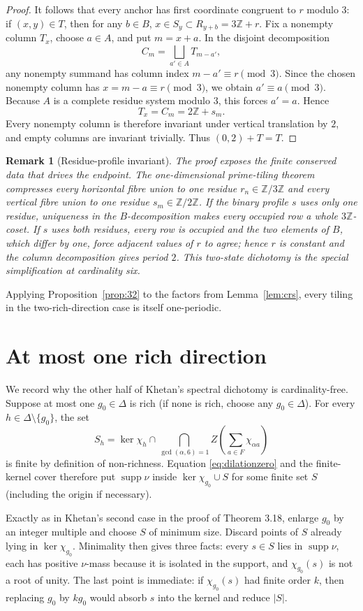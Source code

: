 \documentclass[11pt]{article}
\newtheorem{remark}[theorem]{Remark}
\newcommand{\Z}{\mathbb Z}
\begin{document}
\begin{proof}
It follows that every anchor has first coordinate congruent to $r$ modulo $3$: if $(x,y)\in T$, then for any $b\in B$,
$x\in S_y\subset R_{y+b}=3\Z+r$. Fix a nonempty column $T_x$, choose $a\in A$, and put $m=x+a$. In the disjoint decomposition
\[
 C_m=\bigsqcup_{a'\in A}T_{m-a'},
\]
any nonempty summand has column index $m-a'\equiv r\pmod3$. Since the chosen nonempty column has $x=m-a\equiv r\pmod3$, we obtain $a'\equiv a\pmod3$. Because $A$ is a complete residue system modulo $3$, this forces $a'=a$. Hence
\[
 T_x=C_m=2\Z+s_m.
\]
Every nonempty column is therefore invariant under vertical translation by $2$, and empty columns are invariant trivially. Thus $(0,2)+T=T$.
\end{proof}

\begin{remark}[Residue-profile invariant]\label{rem:invariant}
The proof exposes the finite conserved data that drives the endpoint. The one-dimensional prime-tiling theorem compresses every horizontal fibre union to one residue $r_n\in\Z/3\Z$ and every vertical fibre union to one residue $s_m\in\Z/2\Z$. If the binary profile $s$ uses only one residue, uniqueness in the $B$-decomposition makes every occupied row a whole $3\Z$-coset. If $s$ uses both residues, every row is occupied and the two elements of $B$, which differ by one, force adjacent values of $r$ to agree; hence $r$ is constant and the column decomposition gives period $2$. This two-state dichotomy is the special simplification at cardinality six.
\end{remark}

Applying Proposition~\ref{prop:32} to the factors from Lemma~\ref{lem:crs}, every tiling in the two-rich-direction case is itself one-periodic.

\section{At most one rich direction}
We record why the other half of Khetan's spectral dichotomy is cardinality-free. Suppose at most one $g_0\in\Delta$ is rich (if none is rich, choose any $g_0\in\Delta$). For every $h\in\Delta\setminus\{g_0\}$, the set
\[
 S_h=\ker\chi_h\cap\bigcap_{\gcd(\alpha,6)=1}
 Z\left(\sum_{a\in F}\chi_{\alpha a}\right)
\]
is finite by definition of non-richness. Equation \eqref{eq:dilationzero} and the finite-kernel cover therefore put $\operatorname{supp}\nu$ inside $\ker\chi_{g_0}\cup S$ for some finite set $S$ (including the origin if necessary).

Exactly as in Khetan's second case in the proof of Theorem 3.18, enlarge $g_0$ by an integer multiple and choose $S$ of minimum size. Discard points of $S$ already lying in $\ker\chi_{g_0}$. Minimality then gives three facts: every $s\in S$ lies in $\operatorname{supp}\nu$, each has positive $\nu$-mass because it is isolated in the support, and $\chi_{g_0}(s)$ is not a root of unity. The last point is immediate: if $\chi_{g_0}(s)$ had finite order $k$, then replacing $g_0$ by $kg_0$ would absorb $s$ into the kernel and reduce $|S|$.
\end{document}
